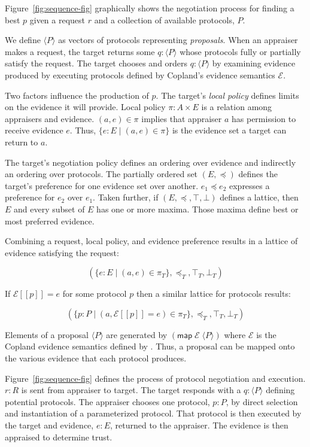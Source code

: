 \documentclass[sigconf,authordraft]{acmart}
\begin{document}
Figure~\ref{fig:sequence-fig} graphically shows the negotiation
process for finding a best $p$ given a request $r$ and a collection of
available protocols, $P$.

We define $\langle P \rangle$ as vectors of protocols representing
\emph{proposals}.  When an appraiser makes a request, the target
returns some $q:\langle P \rangle$ whose protocols fully or partially
satisfy the request. The target chooses and orders
$q:\langle P\rangle$ by examining evidence produced by executing
protocols defined by Copland's evidence semantics $\mathcal{E}$.

Two factors influence the production of $p$.  The target's \emph{local
  policy} defines limits on the evidence it will provide.  Local
policy $\pi : A\times E$ is a relation among appraisers and evidence.
$(a,e)\in\pi$ implies that appraiser $a$ has permission to receive
evidence $e$.  Thus, $\{e:E\mid (a,e)\in\pi\}$ is the evidence set a
target can return to $a$.

The target's negotiation policy defines an ordering over evidence and
indirectly an ordering over protocols.  The partially ordered set
$(E,\preceq)$ defines the target's preference for one evidence set
over another. $e_1\preceq e_2$ expresses a preference for $e_2$ over
$e_1$.  Taken further, if $(E,\preceq,\top,\bot)$ defines a lattice,
then $E$ and every subset of $E$ has one or more maxima.  Those maxima
define best or most preferred evidence.

Combining a request, local policy, and evidence preference results in
a lattice of evidence satisfying the request:

\[(\{e:E\mid (a,e)\in\pi_T\},\preceq_T,\top_T,\bot_T)\]

If $\mathcal{E}[\![p]\!]=e$ for some protocol $p$ then a similar
lattice for protocols results:

\[(\{p:P\mid
  (a,\mathcal{E}[\![p]\!]=e)\in\pi_T\},\preceq_T,\top_T,\bot_T)\]


Elements of a proposal $\langle P\rangle$ are generated by
$(\mathsf{map}\; \mathcal{E}\; \langle P\rangle)$ where $\mathcal{E}$
is the Copland evidence semantics defined by \citet{Ramsdell:2019aa}.
Thus, a proposal can be mapped onto the various evidence that each
protocol produces.

Figure~\ref{fig:sequence-fig} defines the process of protocol
negotiation and execution.  $r:R$ is sent from appraiser to target.
The target responds with a $q:\langle P\rangle$ defining potential
protocols.  The appraiser chooses one protocol, $p:P$, by direct
selection and instantiation of a parameterized protocol.  That
protocol is then executed by the target and evidence, $e:E$, returned
to the appraiser.  The evidence is then appraised to determine trust.
\end{document}
